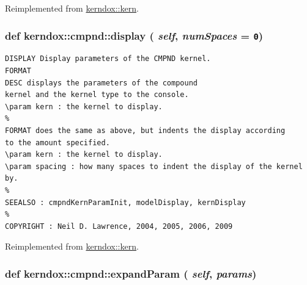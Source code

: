Reimplemented from \hyperlink{classkerndox_1_1kern}{kerndox::kern}.\hypertarget{classkerndox_1_1cmpnd_e7de55282e4d0f93d66642f887da6544}{
\subsubsection[{display}]{\setlength{\rightskip}{0pt plus 5cm}def kerndox::cmpnd::display ( {\em self}, \/   {\em numSpaces} = {\tt 0})}}
\label{classkerndox_1_1cmpnd_e7de55282e4d0f93d66642f887da6544}




\footnotesize\begin{verbatim}DISPLAY Display parameters of the CMPND kernel.
FORMAT
DESC displays the parameters of the compound
kernel and the kernel type to the console.
\param kern : the kernel to display.
%
FORMAT does the same as above, but indents the display according
to the amount specified.
\param kern : the kernel to display.
\param spacing : how many spaces to indent the display of the kernel by.
%
SEEALSO : cmpndKernParamInit, modelDisplay, kernDisplay
%
COPYRIGHT : Neil D. Lawrence, 2004, 2005, 2006, 2009

\end{verbatim}
\normalsize
 

Reimplemented from \hyperlink{classkerndox_1_1kern}{kerndox::kern}.\hypertarget{classkerndox_1_1cmpnd_cc6c3c268042f3e7f7bf8ec1cccd17cf}{
\subsubsection[{expandParam}]{\setlength{\rightskip}{0pt plus 5cm}def kerndox::cmpnd::expandParam ( {\em self}, \/   {\em params})}}
\label{classkerndox_1_1cmpnd_cc6c3c268042f3e7f7bf8ec1cccd17cf}




